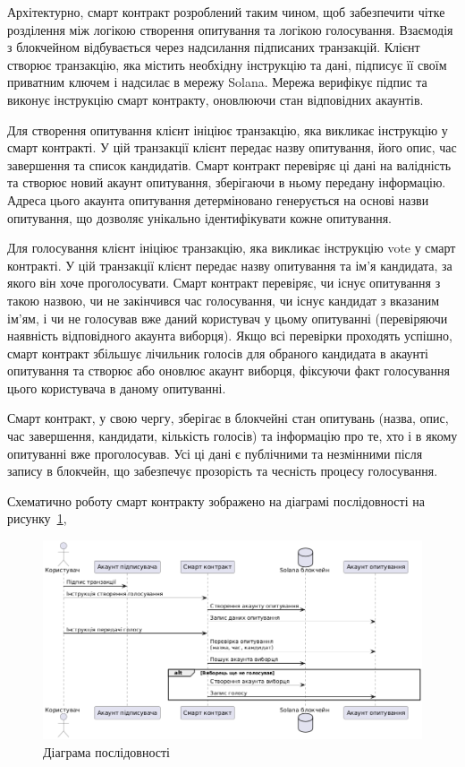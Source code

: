 \documentclass[14pt]{extreport}
\begin{document}
  Архітектурно, смарт контракт розроблений таким чином, щоб забезпечити чітке розділення між логікою створення опитування та логікою голосування. Взаємодія з блокчейном відбувається через надсилання підписаних транзакцій. Клієнт створює транзакцію, яка містить необхідну інструкцію та дані, підписує її своїм приватним ключем і надсилає в мережу Solana. Мережа верифікує підпис та виконує інструкцію смарт контракту, оновлюючи стан відповідних акаунтів.

  Для створення опитування клієнт ініціює транзакцію, яка викликає інструкцію у смарт контракті. У цій транзакції клієнт передає назву опитування, його опис, час завершення та список кандидатів. Смарт контракт перевіряє ці дані на валідність та створює новий акаунт опитування, зберігаючи в ньому передану інформацію. Адреса цього акаунта опитування детерміновано генерується на основі назви опитування, що дозволяє унікально ідентифікувати кожне опитування.

  Для голосування клієнт ініціює транзакцію, яка викликає інструкцію vote у смарт контракті. У цій транзакції клієнт передає назву опитування та ім'я кандидата, за якого він хоче проголосувати. Смарт контракт перевіряє, чи існує опитування з такою назвою, чи не закінчився час голосування, чи існує кандидат з вказаним ім'ям, і чи не голосував вже даний користувач у цьому опитуванні (перевіряючи наявність відповідного акаунта виборця). Якщо всі перевірки проходять успішно, смарт контракт збільшує лічильник голосів для обраного кандидата в акаунті опитування та створює або оновлює акаунт виборця, фіксуючи факт голосування цього користувача в даному опитуванні.
  
  Смарт контракт, у свою чергу, зберігає в блокчейні стан опитувань (назва, опис, час завершення, кандидати, кількість голосів) та інформацію про те, хто і в якому опитуванні вже проголосував. Усі ці дані є публічними та незмінними після запису в блокчейн, що забезпечує прозорість та чесність процесу голосування.
  
  Схематично роботу смарт контракту зображено на діаграмі послідовності на рисунку~\ref{fig:UMLSequence},
  
  \begin{figure}[H]
    \centering
    \includegraphics[scale=0.5]{UMLSequence}
    \caption{Діаграма послідовності}
    \label{fig:UMLSequence}
  \end{figure}
  
\end{document}
